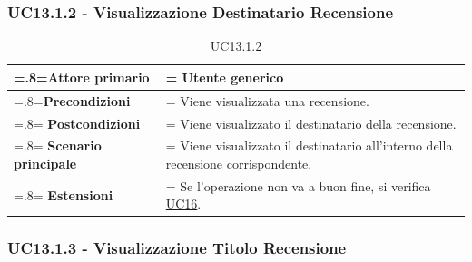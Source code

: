         \subsubsection{UC13.1.2 - Visualizzazione Destinatario Recensione}
        \label{UC13.1.2}

            \begin{table}[H]
                \centering
                \renewcommand{\arraystretch}{1.8}
                \renewcommand\tabularxcolumn[1]{m{#1}}
                \begin{tabularx}{0.9\textwidth} {
                    >{\hsize=.8\hsize\linewidth=\hsize}X
                    >{\hsize=1.2\hsize\linewidth=\hsize}X}
                    \hline
                    \textbf{Attore primario} & Utente generico \\
                    \hline
                    \textbf{Precondizioni} & Viene visualizzata una recensione. \\
                    \hline
                    \textbf{Postcondizioni} & Viene visualizzato il destinatario della recensione. \\
                    \hline
                    \textbf{Scenario principale} & Viene visualizzato il destinatario all'interno della recensione corrispondente. \\
                    \hline
                    \textbf{Estensioni} & Se l'operazione non va a buon fine, si verifica \hyperref[UC16]{UC16}. \\
                    \hline
                \end{tabularx}
                \caption{UC13.1.2}
            \end{table}

        \subsubsection{UC13.1.3 - Visualizzazione Titolo Recensione}
        \label{UC13.1.3}

